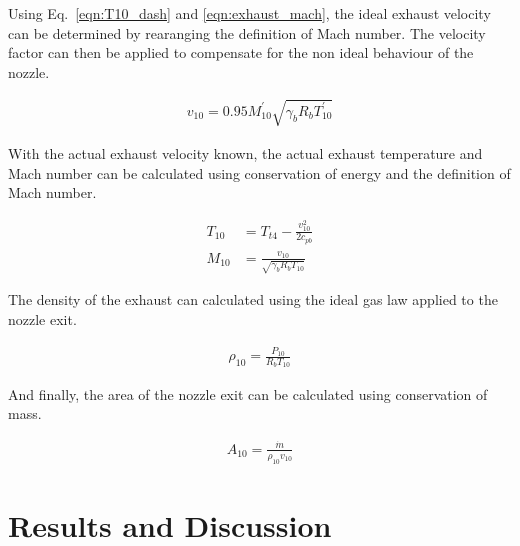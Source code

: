 \documentclass[a4paper]{article}
\begin{document}
Using Eq.~\ref{eqn:T10_dash} and \ref{eqn:exhaust_mach}, the ideal exhaust velocity can be determined by rearanging the definition of Mach number. The velocity factor can then be applied to compensate for the non ideal behaviour of the nozzle.

\begin{align}\label{eqn:v10_dash}
    v_{10} = 0.95 M_{10}^\prime \sqrt{\gamma_b R_b T_{10}^\prime}
\end{align}

With the actual exhaust velocity known, the actual exhaust temperature and Mach number can be calculated using conservation of energy and the definition of Mach number.

\begin{align}
    T_{10} &= T_{t4} - \frac{v_{10}^2}{2c_{pb}} \label{eqn:T10} \\
    M_{10} &= \frac{v_{10}}{\sqrt{\gamma_b R_b T_{10}}} \label{eqn:M10}
\end{align}

The density of the exhaust can calculated using the ideal gas law applied to the nozzle exit.

\begin{align}
    \rho_{10} = \frac{P_{10}}{R_b  T_{10}}
\end{align}

And finally, the area of the nozzle exit can be calculated using conservation of mass.

\begin{align}
    A_{10} = \frac{\dot{m}}{\rho_{10}v_{10}}
\end{align}



\section{Results and Discussion}
\end{document}
